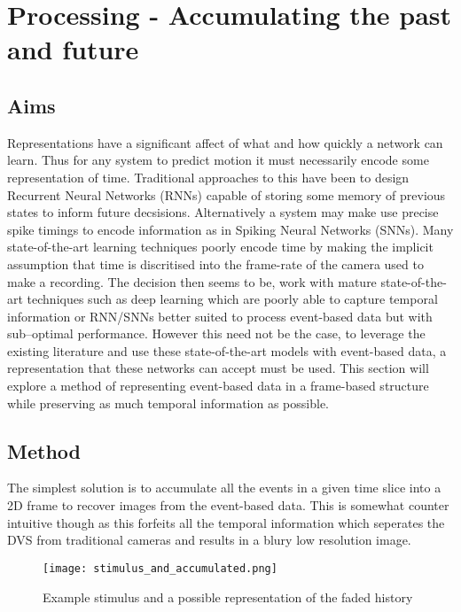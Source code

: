 \chapter{Processing - Accumulating the past and future}
\label{ch:preprocess}

\section{Aims}
Representations have a significant affect of what and how quickly a network can learn\cite{akolkar2015can}. 
Thus for any system to predict motion it must necessarily encode some representation of time. 
Traditional approaches to this have been to design Recurrent Neural Networks (RNNs) capable of storing some memory of previous states to inform future decsisions.  
Alternatively a system may make use precise spike timings to encode information as in Spiking Neural Networks (SNNs). 
Many state-of-the-art learning techniques poorly encode time by making the implicit assumption that time is discritised into the frame-rate of the camera used to make a recording.
The decision then seems to be, work with mature state-of-the-art techniques such as deep learning which are poorly able to capture temporal information or RNN/SNNs better suited to process event-based data but with sub--optimal performance.   
However this need not be the case, to leverage the existing literature and use these state-of-the-art models with event-based data, a representation that these networks can accept must be used. 
This section will explore a method of representing event-based data in a frame-based structure while preserving as much temporal information as possible. 


\section{Method}
The simplest solution is to accumulate all the events in a given time slice into a 2D frame to recover images from the event-based data.
This is somewhat counter intuitive though as this forfeits all the temporal information which seperates the DVS from traditional cameras and results in a blury low resolution image. 

\begin{wrapfigure}{r}{0.6\textwidth}
    \centering
    \texttt{[image: stimulus\_and\_accumulated.png]}
    \caption{Example stimulus and a possible representation of the faded history}
    \label{fig:fadedhistory}
\end{wrapfigure}

